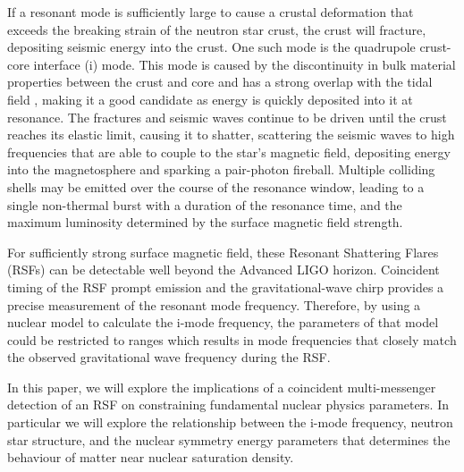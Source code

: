 \documentclass[fleqn,usenatbib]{mnras}
\begin{document}
If a resonant mode is sufficiently large to cause a crustal deformation that exceeds the breaking strain of the neutron star crust, the crust will fracture, depositing seismic energy into the crust. One such mode is the quadrupole crust-core interface (i) mode. This mode is caused by the discontinuity in bulk material properties between the crust and core and has a strong overlap with the tidal field \citet{tsang2012resonant}, making it a good candidate as energy is quickly deposited into it at resonance. The fractures and seismic waves continue to be driven until the crust reaches its elastic limit, causing it to shatter, scattering the seismic waves to high frequencies that are able to couple to the star's magnetic field, depositing energy into the magnetosphere and sparking a pair-photon fireball. Multiple colliding shells may be emitted over the course of the resonance window, leading to a single non-thermal burst with a duration of the resonance time, and the maximum luminosity determined by the surface magnetic field strength. %

For sufficiently strong surface magnetic field, these Resonant Shattering Flares (RSFs) can be detectable well beyond the Advanced LIGO horizon. Coincident timing of the RSF prompt emission and the gravitational-wave chirp provides a precise measurement of the resonant mode frequency. Therefore, by using a nuclear model to calculate the i-mode frequency, the parameters of that model could be restricted to ranges which results in mode frequencies that closely match the observed gravitational wave frequency during the RSF. 

In this paper, we will explore the implications of a coincident multi-messenger detection of an RSF on constraining fundamental nuclear physics parameters. In particular we will explore the relationship between the i-mode frequency, neutron star structure, and the nuclear symmetry energy parameters that determines the behaviour of matter near nuclear saturation density. 
\end{document}
